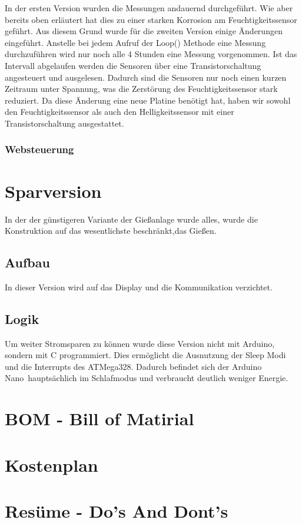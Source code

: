 \documentclass[]{IEEEtran}
\begin{document}
		In der ersten Version wurden die Messungen andauernd durchgeführt. Wie aber bereits oben erläutert hat dies zu einer starken Korrosion am Feuchtigkeitssensor geführt. Aus diesem Grund wurde für die zweiten Version einige Änderungen eingeführt. Anstelle bei jedem Aufruf der Loop() Methode eine Messung durchzuführen wird nur noch alle 4 Stunden eine Messung vorgenommen. Ist das Intervall abgelaufen werden die Sensoren über eine Transistorschaltung angesteuert und ausgelesen. Dadurch sind die Sensoren nur noch einen kurzen Zeitraum unter Spannung, was die Zerstörung des Feuchtigkeitssensor stark reduziert. Da diese Änderung eine neue Platine benötigt hat, haben wir sowohl den Feuchtigkeitssensor als auch den Helligkeitssensor mit einer Transistorschaltung ausgestattet. 
		
	
		\subsubsection{Websteuerung}
		
			\section{Sparversion}
	In der der günstigeren Variante der Gießanlage wurde alles, wurde die Konstruktion auf das wesentlichste beschränkt,das Gießen.
	\subsection{Aufbau}
	In dieser Version wird auf das Display und die Kommunikation verzichtet.
	
	\subsection{Logik}
	Um weiter Stromsparen zu können wurde diese Version nicht mit Arduino, sondern mit C programmiert.
	Dies ermöglicht die Ausnutzung der Sleep Modi und die Interrupts des ATMega328. 
	Dadurch befindet sich der \glqq Arduino Nano\grqq \ hauptsächlich im Schlafmodus und verbraucht deutlich weniger Energie. 
	
	\section{BOM - Bill of Matirial}
	
	\section{Kostenplan}
	
	\section{Resüme - Do's And Dont's}	
\end{document}
